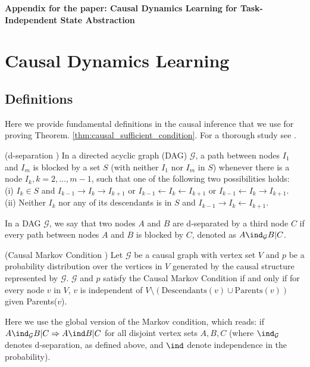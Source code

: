 \onecolumn
\textbf{\Large Appendix for the paper: Causal Dynamics Learning for Task-Independent State Abstraction}

\section{Causal Dynamics Learning}
\subsection{Definitions}
\label{app:definitions}

Here we provide fundamental definitions in the causal inference that we use for proving Theorem. \ref{thm:causal_sufficient_condition}. For a thorough study see \citet{pearl2009causality}. 

\begin{definition}
\label{def:d_separation}
(d-separation \cite{pearl2009causality}) In a directed acyclic graph (DAG) $\mathcal{G}$, a path between nodes $I_1$ and $I_m$ is blocked by a set $S$ (with neither $I_1$ nor $I_m$ in $S$) whenever there is a node $I_k, k = 2, \dots,m - 1$, such that one of the following two possibilities holds:\\
(i) $I_k \in S$ and $I_{k-1} \rightarrow I_k \rightarrow I_{k+1}$ or $I_{k-1} \leftarrow I_k \leftarrow I_{k+1}$ or $I_{k-1} \leftarrow I_k \rightarrow I_{k+1}$. \\
(ii) Neither $I_k$ nor any of its descendants is in $S$ and $I_{k-1} \rightarrow I_k \leftarrow I_{k+1}$.
\end{definition}
In a DAG $\mathcal{G}$, we say that two nodes $A$ and $B$ are d-separated by a third node $C$ if every path between nodes $A$ and $B$ is blocked by $C$, denoted as $A \ind_\mathcal{G} B | C$.

\begin{definition}
\label{def:causal_markov_condition}
(Causal Markov Condition \cite{spirtes2000causation}) Let $\mathcal{G}$ be a causal graph with vertex set $V$ and $p$ be a probability distribution over the vertices in $V$ generated by the causal structure represented by $\mathcal{G}$. $\mathcal{G}$ and $p$ satisfy the Causal Markov Condition if and only if for every node $v$ in $V$, $v$ is independent of $V \setminus  (\text{Descendants}(v) \cup \text{Parents}(v))$ given Parents($v$).
\end{definition}

Here we use the global version of the Markov condition, which reads: if $A \ind_\mathcal{G} B | C \Rightarrow A \ind B | C$ for all disjoint vertex sets $A, B, C$ (where $\ind_\mathcal{G}$ denotes d-separation, as defined above, and $\ind$ denote independence in the probability).

